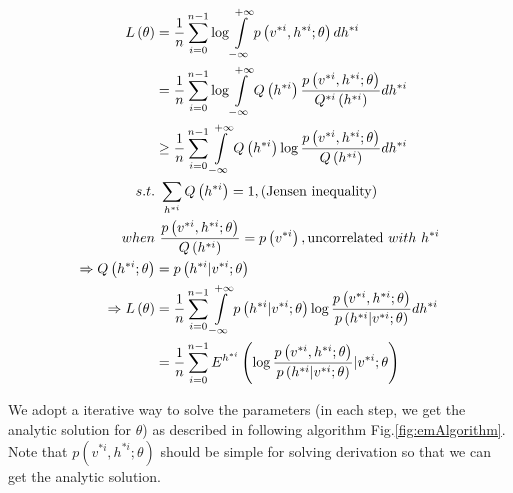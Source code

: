 \documentclass[runningheads,openany]{xhlPaper}
\begin{document}
\begin{equation}
\label{equ:emJensen}
\begin{aligned}
L\left( \theta  \right) &= \frac{1}{n}\sum\limits_{i = 0}^{n - 1} {\log \int\limits_{ - \infty }^{ + \infty } {p\left( {{v^{*i}},{h^{*i}};\theta } \right)d{h^{*i}}} } \\
 &= \frac{1}{n}\sum\limits_{i = 0}^{n - 1} {\log \int\limits_{ - \infty }^{ + \infty } {Q\left( {{h^{*i}}} \right)\frac{{p\left( {{v^{*i}},{h^{*i}};\theta } \right)}}{{{Q^{*i}}\left( {{h^{*i}}} \right)}}d{h^{*i}}} } \\
 &\ge \frac{1}{n}\sum\limits_{i = 0}^{n - 1} {\int\limits_{ - \infty }^{ + \infty } {Q\left( {{h^{*i}} } \right)\log \frac{{p\left( {{v^{*i}},{h^{*i}};\theta } \right)}}{{Q\left( {{h^{*i}} } \right)}}d{h^{*i}}} } \\
s.t.&\ \sum\limits_{{h^{*i}}} {Q\left( {{h^{*i}} } \right)}  = 1, \left( {{\rm{Jensen\ inequality}}} \right)\\
when&\ \frac{{p\left( {{v^{*i}},{h^{*i}};\theta } \right)}}{{Q\left( {{h^{*i}} } \right)}} =  p\left( {{v^{*i}}} \right),{\rm{uncorrelated}}\ with\ {h^{*i}}\\
 \Rightarrow Q\left( {{h^{*i}};\theta } \right) &= p\left( {{h^{*i}}|{v^{*i}};\theta } \right)\\
 \Rightarrow L\left( \theta  \right) &= \frac{1}{n}\sum\limits_{i = 0}^{n - 1} {\int\limits_{ - \infty }^{ + \infty } {p\left( {{h^{*i}}|{v^{*i}};\theta } \right)\log \frac{{p\left( {{v^{*i}},{h^{*i}};\theta } \right)}}{{p\left( {{h^{*i}}|{v^{*i}};\theta } \right)}}d{h^{*i}}} } \\
 &= \frac{1}{n}\sum\limits_{i = 0}^{n - 1} {{E^{{h^{*i}}}}\left( {\log \frac{{p\left( {{v^{*i}},{h^{*i}};\theta } \right)}}{{p\left( {{h^{*i}}|{v^{*i}};\theta } \right)}}|{v^{*i}};\theta } \right)} 
\end{aligned}
\end{equation}

We adopt a iterative way to solve the parameters (in each step, we get the analytic solution for $\theta$) as described in following algorithm Fig.\ref{fig:emAlgorithm}. Note that $p\left( {{v^{*i}},{h^{*i}};\theta } \right)$ should be simple for solving derivation so that we can get the analytic solution.
\end{document}
